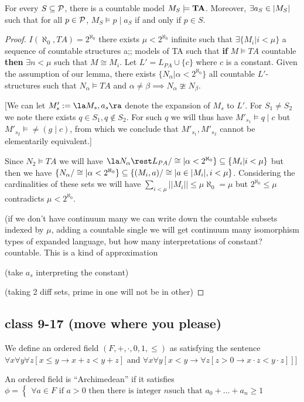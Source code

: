 \begin{boxlemma}
    For every $S \subseteq \mathcal{P}$, there is a countable model $M_S \models \mathbf{TA}$. Moreover, $\exists a_S \in \left\lvert M_S \right\rvert$ such that for all $p \in \mathcal{P}$, $M_S \models p \mid a_S$ if and only if $p \in S$.
\end{boxlemma}
\begin{proof}
    $I(\aleph_0, TA)=2^{\aleph_0}$ there exists $\mu<2^{\aleph_0}$ infinite such that $\exists \{M_i|i<\mu\}$ a sequence of countable structures a;; models of TA such that \textbf{if} $M\models TA$ countable \textbf{then}  $\exists n<\mu$ such that $M\cong M_i$. Let $L'=L_{PA}\cup \{c\}$ where $c$ is a constant. Given the assumption of our lemma, there exists $\{N_{\alpha}|\alpha<2^{\aleph_0}\}$ all countable $L'$-structures such that $N_{\alpha}\models TA$ and $\alpha \neq \beta \implies N_{\alpha}\ncong N_{\beta}$. 

    [We can let $M'_s:=\la M_s, a_s\ra$ denote the expansion of $M_s$ to $L'$. For $S_1\neq S_2$ we note there exists $q\in S_1, q \notin S_2$. For such $q$ we will thus have $M'_{s_1}\models q\mid c$ but $M'_{s_2}\models \neq (g\mid c)$, from which we conclude that $M'_{s_1}, M'_{s_2}$ cannot be elementarily equivalent.]

    Since $N_2\models TA$ we will have $\la N_{\alpha}\rest L_{PA}/\cong|\alpha <2^{\aleph_0}\}\ssq \{M_i|i<\mu\}$ but then we have $\{N_{\alpha}/\cong |\alpha<2^{\aleph_0}\}\subseteq \{ (M_i, a)/\cong|a\in |M_i|, i<\mu\}$. Considering the cardinalities of these sets we will have $\sum_{i<\mu}||M_i||\leq \mu \aleph_0=\mu$ but $2^{\aleph_0}\leq \mu$ contradicts $\mu<2^{\aleph_0}$. \sorry

    (if we don't have continuum many we can write down the countable subsets indexed by $\mu$, adding a countable single we will get continuum many isomorphism types of expanded language, but how many interpretations of constant? countable. This is a kind of approximation

    
     (take $a_s$ interpreting the constant)

    (taking 2 diff sets, prime in one will not be in other)
\end{proof}

\subsection*{class 9-17 (move where you please)}
\begin{boxdefinition}
    We define an ordered field $(F, +, \cdot, 0, 1, \leq)$ as satisfying the sentence $\forall x \forall y \forall z[x\leq y\rightarrow x+z<y+z]$ and $\forall x \forall y[x<y\rightarrow \forall z[z>0\rightarrow x\cdot z<y\cdot z]]]$
\end{boxdefinition}
\begin{boxdefinition}
    An ordered field is ``Archimedean'' if it satisfies $\phi=\begin{cases}
    \forall a \in F\text{ if }a>0\text{ then there is integer }n\text{such that }a_0+\ldots + a_n\geq 1\end{cases}$
\end{boxdefinition}


